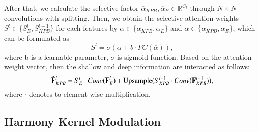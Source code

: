 \documentclass[10pt,twocolumn,letterpaper]{article}
\begin{document}
After that, we calculate the selective factor $\overline{\alpha}_{KPB},\overline{\alpha}_{E} \in \mathbb{R}^{C_{l}}$ through $N \times N$ convolutions with splitting. Then, we obtain the selective attention weights $S^l \in \{ S_E^l, S_{KPB}^{l-1} \}$ for each features by $\alpha \in \{ \alpha_{KPB},\alpha_{E}\}$ and  $\overline{\alpha} \in \{ \overline{\alpha}_{KPB},\overline{\alpha}_{E} \}$, which can be formulated as
\begin{equation}
    S^l = \sigma ( \alpha + b \cdot FC(\overline{\alpha})), 
\end{equation}
where b is a learnable parameter, $\sigma$ is sigmoid function. Based on the attention weight vector, then the shallow and deep information are interacted as follows:
\begin{equation}
    \hat{\mathbf{F}}_{KPB}^{l} = S_{E}^{l} \cdot Conv(\mathbf{F}_{E}^{l}) + {\rm Upsample} ( S^{l-1}_{KPB} \cdot Conv(\mathbf{F}^{l-1}_{KPB})),
\end{equation}
where $\cdot$ denotes to element-wise multiplication.

\subsection{Harmony Kernel Modulation}
\label{sec:pixel_filtering}
\end{document}
